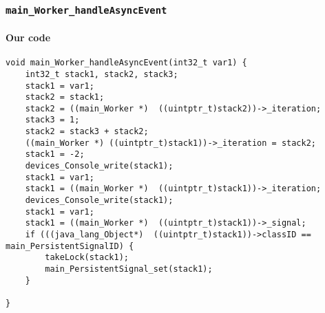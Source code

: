 \begin{landscape}
\begin{multicols}{2}
\subsubsection{\texttt{main\_Worker\_handleAsyncEvent}}

\paragraph{Our code}\hfill
\begin{lstlisting}[firstnumber=2230]
void main_Worker_handleAsyncEvent(int32_t var1) {
	int32_t stack1, stack2, stack3;
	stack1 = var1;
	stack2 = stack1;
	stack2 = ((main_Worker *)  ((uintptr_t)stack2))->_iteration;
	stack3 = 1;
	stack2 = stack3 + stack2;
	((main_Worker *) ((uintptr_t)stack1))->_iteration = stack2;
	stack1 = -2;
	devices_Console_write(stack1);
	stack1 = var1;
	stack1 = ((main_Worker *)  ((uintptr_t)stack1))->_iteration;
	devices_Console_write(stack1);
	stack1 = var1;
	stack1 = ((main_Worker *)  ((uintptr_t)stack1))->_signal;
	if (((java_lang_Object*)  ((uintptr_t)stack1))->classID == main_PersistentSignalID) {
		takeLock(stack1);
		main_PersistentSignal_set(stack1);
	}

}
\end{lstlisting}


\end{multicols}
\end{landscape}
